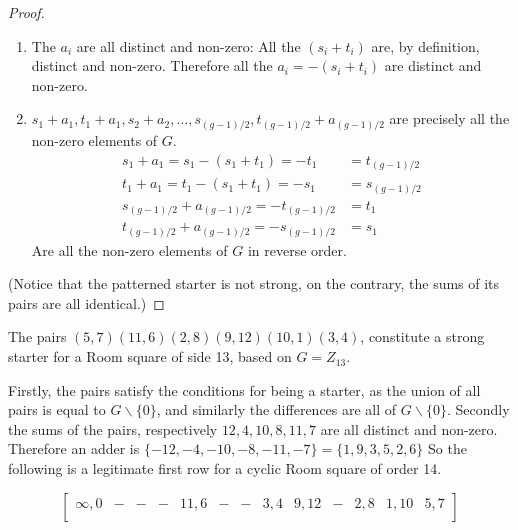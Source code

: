\begin{proof}\leavevmode
\begin{enumerate}
  \item{The $a_i$ are all distinct and non-zero:
    All the $(s_i + t_i)$ are, by definition, distinct
    and non-zero. Therefore all the $a_i = -(s_i + t_i)$ are
    distinct and non-zero.}
  \item{$s_1 + a_1, t_1 + a_1, s_2 + a_2, \ldots, s_{(g - 1)/2}, t_{(g - 1)/2} + a_{(g - 1)/2}$
    are precisely all the non-zero elements of $G$.
    \begin{align*}
      s_1 + a_1 = s_1 - (s_1 + t_1) = -t_1 &= t_{(g - 1)/2}  \\
      t_1 + a_1 = t_1 - (s_1 + t_1) = -s_1 &= s_{(g - 1)/2}  \\
      s_{(g - 1)/2} + a_{(g - 1)/2} = -t_{(g - 1)/2} &= t_1  \\
      t_{(g - 1)/2} + a_{(g - 1)/2} = -s_{(g - 1)/2} &= s_1 
    \end{align*}
    Are all the non-zero elements of $G$ in reverse order.}
\end{enumerate}
(Notice that the patterned starter is not strong, on the contrary, the sums of its pairs are all identical.)
\end{proof}

\begin{example}
The pairs
$(5, 7)(11, 6)(2, 8)(9, 12)(10, 1)(3, 4)$,
constitute a strong starter for a Room square of side 13, based on $G = Z_{13}$.

Firstly, the pairs satisfy the conditions for being a starter, as the union of all pairs is equal to $G \backslash \{0\}$, and similarly the differences are all of $G\backslash \{0\}$.
Secondly the sums of the pairs, respectively $12, 4, 10, 8, 11, 7$ are all distinct and non-zero.
Therefore an adder is
$\{-12, -4, -10, -8, -11, -7\} = \{1, 9, 3, 5, 2, 6\}$
So the following is a legitimate first row for a cyclic Room square of order 14.

\begin{equation}
  \begin{bmatrix}
    \infty, 0 & - & - & - & 11,6 & - & - & 3,4 & 9,12 & - & 2,8 & 1,10 & 5,7 \\
  \end{bmatrix}
\end{equation}

\end{example}

